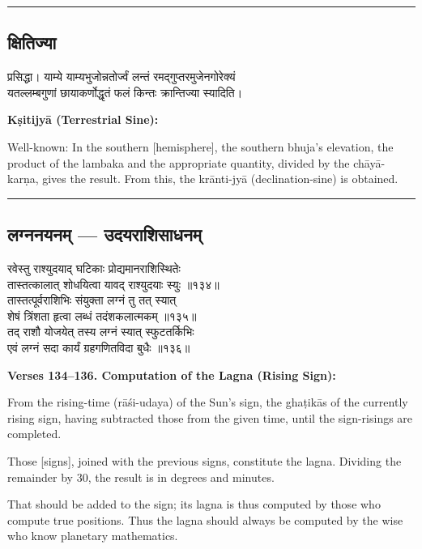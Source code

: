 \documentclass[11pt,a4paper]{article}
\newcommand{\longline}{\noindent\rule{\textwidth}{0.4pt}}
\newcommand{\dev}[1]{{\devanagarifont #1}}
\newcommand{\sectsep}{\par\vspace{0.8em}\longline\vspace{0.8em}}
\begin{document}
\sectsep

\subsection{\dev{क्षितिज्या}}

\begin{minipage}[t]{0.48\textwidth}
\small\devanagarifont
प्रसिद्धा। याम्ये याम्यभुजोन्नतोर्ज्वं लन्तं रमद्‌गुप्तरमुजेनगोरेक्यं\\
यतल्लम्बगुणां छायाकर्णोद्धृतं फलं किन्तः क्रान्तिज्या स्यादिति।
\end{minipage}%
\hfill
\begin{minipage}[t]{0.48\textwidth}
\small
\textbf{K\d{s}itijy\=a (Terrestrial Sine):}

Well-known: In the southern [hemisphere], the southern bhuja's elevation, the product of the lambaka and the appropriate quantity, divided by the ch\=ay\=a-kar\d{n}a, gives the result. From this, the kr\=anti-jy\=a (declination-sine) is obtained.
\end{minipage}

\sectsep

\subsection{\dev{लग्ननयनम् --- उदयराशिसाधनम्}}

\begin{minipage}[t]{0.48\textwidth}
\small\devanagarifont
रवेस्तु राश्युदयाद् घटिकाः प्रोद्यमानराशिस्थितेः\\
तास्तत्कालात् शोधयित्वा यावद् राश्युदयाः स्युः ॥१३४॥\\[0.5em]
तास्तत्पूर्वराशिभिः संयुक्ता लग्नं तु तत् स्यात्\\
शेषं त्रिंशता हृत्वा लब्धं तदंशकलात्मकम् ॥१३५॥\\[0.5em]
तद् राशौ योजयेत् तस्य लग्नं स्यात् स्फुटतर्किभिः\\
एवं लग्नं सदा कार्यं ग्रहगणितविदा बुधैः ॥१३६॥
\end{minipage}%
\hfill
\begin{minipage}[t]{0.48\textwidth}
\small
\textbf{Verses 134--136. Computation of the Lagna (Rising Sign):}

From the rising-time (r\=a\'si-udaya) of the Sun's sign, the gha\d{t}ik\=as of the currently rising sign, having subtracted those from the given time, until the sign-risings are completed.

Those [signs], joined with the previous signs, constitute the lagna. Dividing the remainder by 30, the result is in degrees and minutes.

That should be added to the sign; its lagna is thus computed by those who compute true positions. Thus the lagna should always be computed by the wise who know planetary mathematics.
\end{minipage}
\end{document}
